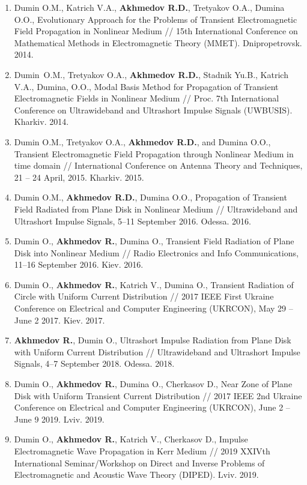 \begin{center}
\begin{enumerate}
\item Dumin O.M., Katrich V.A., \textbf{Akhmedov R.D.}, Tretyakov O.A., 
Dumina O.O., Evolutionary Approach for the Problems of Transient 
Electromagnetic Field Propagation in Nonlinear Medium // 15th International 
Conference on Mathematical Methods in Electromagnetic Theory (MMET).
Dnipropetrovsk. 2014.

\item Dumin O.M., Tretyakov O.A., \textbf{Akhmedov R.D.}, Stadnik Yu.B., 
Katrich V.A., Dumina, O.O., Modal Basis Method for Propagation of 
Transient Electromagnetic Fields in Nonlinear Medium // Proc. 7th 
International Conference on Ultrawideband and Ultrashort Impulse Signals 
(UWBUSIS). Kharkiv. 2014.

\item Dumin O.M., Tretyakov O.A., \textbf{Akhmedov R.D.}, and Dumina O.O., 
Transient Electromagnetic Field Propagation through Nonlinear Medium in 
time domain // International Conference on Antenna Theory and Techniques, 
21 -- 24 April, 2015. Kharkiv. 2015.

\item Dumin O.M., \textbf{Akhmedov R.D.}, Dumina O.O., Propagation of 
Transient Field Radiated from Plane Disk in Nonlinear Medium // 
Ultrawideband and Ultrashort Impulse Signals, 5--11 September 2016. 
Odessa. 2016.

\item Dumin O., \textbf{Akhmedov R.}, Dumina O., Transient Field 
Radiation of Plane Disk into Nonlinear Medium // Radio Electronics and 
Info Communications, 11--16 September 2016. Kiev. 2016.

\item Dumin O., \textbf{Akhmedov R.}, Katrich V., Dumina O., Transient 
Radiation of Circle with Uniform Current Distribution // 2017 IEEE First 
Ukraine Conference on Electrical and Computer Engineering (UKRCON), 
May 29 -- June 2 2017. Kiev. 2017.

\item \textbf{Akhmedov R.}, Dumin O., Ultrashort Impulse Radiation from 
Plane Disk with Uniform Current Distribution // Ultrawideband and 
Ultrashort Impulse Signals, 4--7 September 2018. Odessa. 2018.

\item Dumin O., \textbf{Akhmedov R.}, Dumina O., Cherkasov D., Near Zone 
of Plane Disk with Uniform Transient Current Distribution // 2017 IEEE 2nd 
Ukraine Conference on Electrical and Computer Engineering (UKRCON), 
June 2 -- June 9 2019. Lviv. 2019.

\item Dumin O., \textbf{Akhmedov R.}, Katrich V., Cherkasov D., 
Impulse Electromagnetic Wave Propagation in Kerr Medium // 2019 XXIVth 
International Seminar/Workshop on Direct and Inverse Problems of 
Electromagnetic and Acoustic Wave Theory (DIPED). Lviv. 2019.

\setcounter{ItemsInMyWriting}{\value{enumi}}
\end{enumerate}

\end{center}
